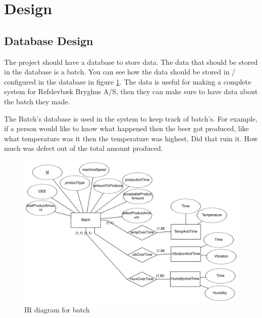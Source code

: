 \section{Design}

\subsection{Database Design}
The project should have a database to store data. 
The data that should be stored in the database is a batch. 
You can see how the data should be stored in / 
configured in the database in figure \ref{figure:eer_diagram_batch}.
The data is useful for making a complete system for Refslevbæk Bryghus A/S, 
then they can make sure to have data about the batch they made. 

The Batch's database is used in the system to keep track of batch's.
For example, if a person would like to know what happened then the beer got produced,
like what temperature was it then the temperature was highest, Did that ruin it.
How much was defect out of the total amount produced. 

\begin{figure}[ht]
\centering 
\includegraphics[width=0.8\linewidth]{images/eer_diagrams/database_EER_batch.png}
\caption{IR diagram for batch} 
\label{figure:eer_diagram_batch}
\end{figure}
